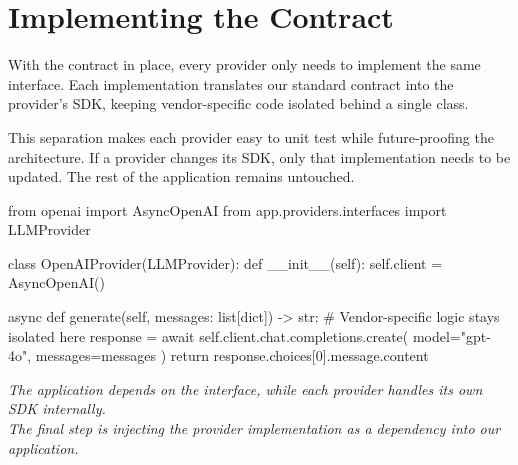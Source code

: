\documentclass[11pt]{article}
\begin{document}
\newpage

\section*{Implementing the Contract}
\vspace{0.15in}

With the contract in place, every provider only needs to implement the same interface. Each implementation translates our standard contract into the provider's SDK, keeping vendor-specific code isolated behind a single class.

\vspace{0.1in}

This separation makes each provider easy to unit test while future-proofing the architecture. If a provider changes its SDK, only that implementation needs to be updated. The rest of the application remains untouched.

\vspace{0.2in}

\begin{codebox}
from openai import AsyncOpenAI
from app.providers.interfaces import LLMProvider

class OpenAIProvider(LLMProvider):
    def __init__(self):
        self.client = AsyncOpenAI()

    async def generate(self, messages: list[dict]) -> str:
        # Vendor-specific logic stays isolated here
        response = await self.client.chat.completions.create(
            model="gpt-4o",
            messages=messages
        )
        return response.choices[0].message.content
\end{codebox}

\vspace{0.4in}

\begin{center}
\color{brandgray}

\large\textit{The application depends on the interface, while each provider handles its own SDK internally.\\[0.15in]
The final step is injecting the provider implementation as a dependency into our application.}

\end{center}

\newpage
\end{document}
